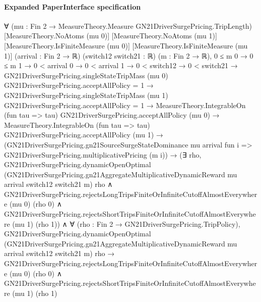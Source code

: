 \documentclass[10pt]{article}
\begin{document}
\paragraph{Expanded PaperInterface specification}
\begin{ReviewVerbatim}
∀ (mu : Fin 2 → MeasureTheory.Measure GN21DriverSurgePricing.TripLength) [MeasureTheory.NoAtoms (mu 0)]
  [MeasureTheory.NoAtoms (mu 1)] [MeasureTheory.IsFiniteMeasure (mu 0)] [MeasureTheory.IsFiniteMeasure (mu 1)]
  (arrival : Fin 2 → ℝ) (switch12 switch21 : ℝ) (m : Fin 2 → ℝ),
  0 ≤ m 0 →
    0 ≤ m 1 →
      0 < arrival 0 →
        0 < arrival 1 →
          0 < switch12 →
            0 < switch21 →
              GN21DriverSurgePricing.singleStateTripMass (mu 0) GN21DriverSurgePricing.acceptAllPolicy = 1 →
                GN21DriverSurgePricing.singleStateTripMass (mu 1) GN21DriverSurgePricing.acceptAllPolicy = 1 →
                  MeasureTheory.IntegrableOn (fun tau => tau) GN21DriverSurgePricing.acceptAllPolicy (mu 0) →
                    MeasureTheory.IntegrableOn (fun tau => tau) GN21DriverSurgePricing.acceptAllPolicy (mu 1) →
                      (GN21DriverSurgePricing.gn21SourceSurgeStateDominance mu arrival fun i =>
                          GN21DriverSurgePricing.multiplicativePricing (m i)) →
                        (∃ rho,
                            GN21DriverSurgePricing.dynamicOpenOptimal
                                (GN21DriverSurgePricing.gn21AggregateMultiplicativeDynamicReward mu arrival switch12
                                  switch21 m)
                                rho ∧
                              GN21DriverSurgePricing.rejectsLongTripsFiniteOrInfiniteCutoffAlmostEverywhere (mu 0)
                                  (rho 0) ∧
                                GN21DriverSurgePricing.rejectsShortTripsFiniteOrInfiniteCutoffAlmostEverywhere (mu 1)
                                  (rho 1)) ∧
                          ∀ (rho : Fin 2 → GN21DriverSurgePricing.TripPolicy),
                            GN21DriverSurgePricing.dynamicOpenOptimal
                                (GN21DriverSurgePricing.gn21AggregateMultiplicativeDynamicReward mu arrival switch12
                                  switch21 m)
                                rho →
                              GN21DriverSurgePricing.rejectsLongTripsFiniteOrInfiniteCutoffAlmostEverywhere (mu 0)
                                  (rho 0) ∧
                                GN21DriverSurgePricing.rejectsShortTripsFiniteOrInfiniteCutoffAlmostEverywhere (mu 1)
                                  (rho 1)
\end{ReviewVerbatim}
\end{document}
